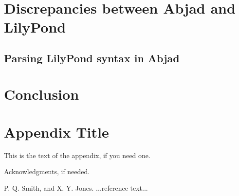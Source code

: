 \documentclass{sigplanconf}
\begin{document}
\section{Discrepancies between Abjad and LilyPond}

\subsection{Parsing LilyPond syntax in Abjad}

\section{Conclusion}

\appendix
\section{Appendix Title}

This is the text of the appendix, if you need one.

\acks

Acknowledgments, if needed.





\begin{thebibliography}{}
\softraggedright

P. Q. Smith, and X. Y. Jones. ...reference text...

\end{thebibliography}
\end{document}
